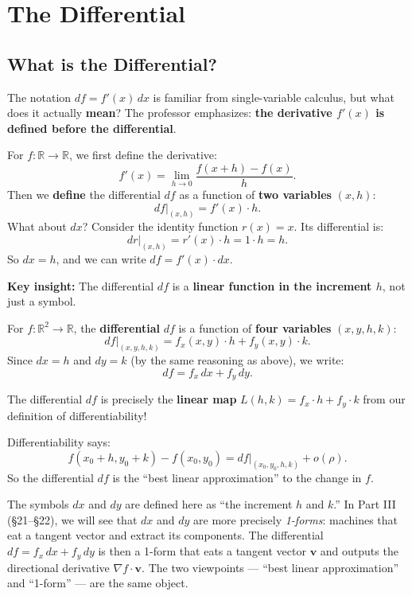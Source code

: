 \documentclass[11pt]{report}
\newcommand{\R}{\mathbb{R}}
\begin{document}
\section{The Differential}

\subsection*{What is the Differential?}

The notation $df = f'(x) \, dx$ is familiar from single-variable calculus, but what does it actually \textbf{mean}? The professor emphasizes: \textbf{the derivative $f'(x)$ is defined before the differential}.

\begin{remark}
For $f: \R \to \R$, we first define the derivative:
\[
f'(x) = \lim_{h \to 0} \frac{f(x + h) - f(x)}{h}.
\]
Then we \textbf{define} the differential $df$ as a function of \textbf{two variables} $(x, h)$:
\[
df\big|_{(x, h)} = f'(x) \cdot h.
\]
What about $dx$? Consider the identity function $r(x) = x$. Its differential is:
\[
dr\big|_{(x, h)} = r'(x) \cdot h = 1 \cdot h = h.
\]
So $dx = h$, and we can write $df = f'(x) \cdot dx$.

\textbf{Key insight:} The differential $df$ is a \textbf{linear function in the increment $h$}, not just a symbol.
\end{remark}

\begin{definition}
For $f : \R^2 \to \R$, the \textbf{differential} $df$ is a function of \textbf{four variables} $(x, y, h, k)$:
\[
df\big|_{(x, y, h, k)} = f_x(x, y) \cdot h + f_y(x, y) \cdot k.
\]
Since $dx = h$ and $dy = k$ (by the same reasoning as above), we write:
\[
df = f_x \, dx + f_y \, dy.
\]
\end{definition}

\begin{remark}
The differential $df$ is precisely the \textbf{linear map} $L(h, k) = f_x \cdot h + f_y \cdot k$ from our definition of differentiability!

Differentiability says:
\[
f(x_0 + h, y_0 + k) - f(x_0, y_0) = df\big|_{(x_0, y_0, h, k)} + o(\rho).
\]
So the differential $df$ is the ``best linear approximation'' to the change in $f$.
\end{remark}

\begin{note}
The symbols $dx$ and $dy$ are defined here as ``the increment $h$ and $k$.'' In Part III (\S21--\S22), we will see that $dx$ and $dy$ are more precisely \textit{1-forms}: machines that eat a tangent vector and extract its components. The differential $df = f_x\,dx + f_y\,dy$ is then a 1-form that eats a tangent vector $\mathbf{v}$ and outputs the directional derivative $\nabla f \cdot \mathbf{v}$. The two viewpoints --- ``best linear approximation'' and ``1-form'' --- are the same object.
\end{note}
\end{document}
